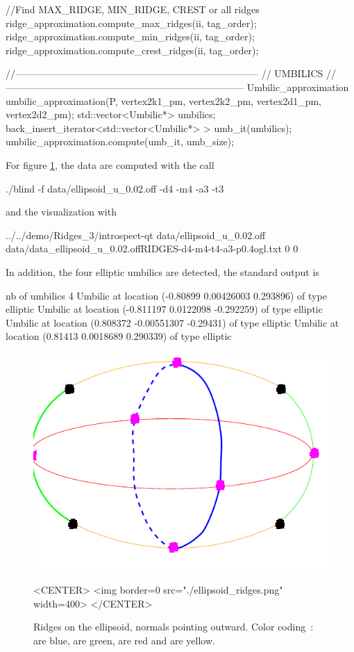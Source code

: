 \begin{ccExampleCode}
{  //Find MAX_RIDGE, MIN_RIDGE, CREST or all ridges
  ridge_approximation.compute_max_ridges(ii, tag_order);  
  ridge_approximation.compute_min_ridges(ii, tag_order);  
  ridge_approximation.compute_crest_ridges(ii, tag_order);  

  //---------------------------------------------------------------------------
  // UMBILICS
  //--------------------------------------------------------------------------
  Umbilic_approximation umbilic_approximation(P, 
					      vertex2k1_pm, vertex2k2_pm,
					      vertex2d1_pm, vertex2d2_pm);
  std::vector<Umbilic*> umbilics;
  back_insert_iterator<std::vector<Umbilic*> > umb_it(umbilics);
  umbilic_approximation.compute(umb_it, umb_size);
 }
\end{ccExampleCode}

For figure \ref{ellipsoid-ridges-example}, the data are computed with
the call
\begin{ccExampleCode}
./blind -f data/ellipsoid_u_0.02.off -d4 -m4 -a3 -t3
\end{ccExampleCode}
and the visualization with 
\begin{ccExampleCode}
 ../../demo/Ridges_3/introspect-qt data/ellipsoid_u_0.02.off data/data_ellipsoid_u_0.02.offRIDGES-d4-m4-t4-a3-p0.4ogl.txt 0 0
\end{ccExampleCode}
In addition, the four elliptic umbilics are detected, the standard output is 
\begin{ccExampleCode}
nb of umbilics 4
Umbilic at location (-0.80899 0.00426003 0.293896) of type elliptic
Umbilic at location (-0.811197 0.0122098 -0.292259) of type elliptic
Umbilic at location (0.808372 -0.00551307 -0.29431) of type elliptic
Umbilic at location (0.81413 0.0018689 0.290339) of type elliptic
\end{ccExampleCode}


\begin{figure}[!ht]
\begin{ccTexOnly}
\centerline{
\includegraphics[width=.5\linewidth]{Ridges_3/ellipsoid_ridges}}
\end{ccTexOnly}

\begin{ccHtmlOnly}
<CENTER> <img border=0 src="./ellipsoid_ridges.png" width=400>
</CENTER>
\end{ccHtmlOnly}
\caption{Ridges on the ellipsoid, normals pointing outward.
 Color coding~:  are blue,
 are green,  are red and 
 are yellow. }
\label{ellipsoid-ridges-example}
\end{figure}


